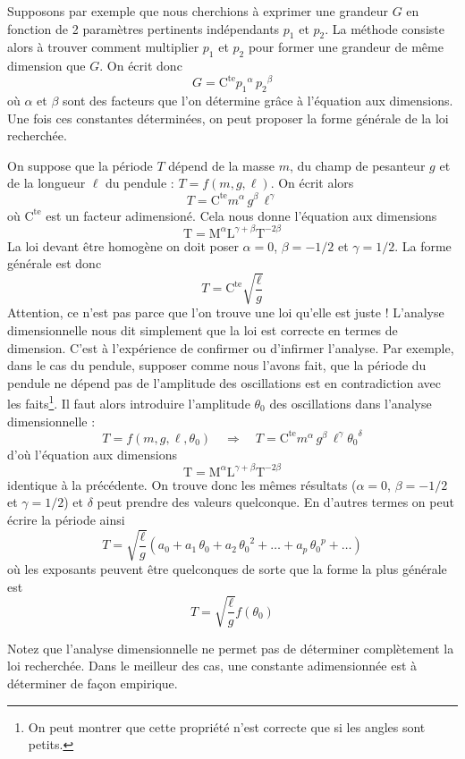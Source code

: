 Supposons par exemple que nous cherchions à exprimer une grandeur $G$ en fonction de 2 paramètres pertinents indépendants $p_{1}$ et $p_{2}$. La méthode consiste alors à trouver comment multiplier $p_1$ et $p_2$ pour former une grandeur de  même dimension que $G$. On écrit donc 
	\[G=\mathrm{C^{te}}{p_1}^\alpha\,{p_2}^\beta\]
où $\alpha$ et $\beta$ sont des facteurs que l'on détermine grâce à l'équation aux dimensions. Une fois ces constantes déterminées, on peut proposer la forme générale de la loi recherchée.

\begin{kaoexample}[frametitle=Exemple : période d'oscillation $T$ d'un pendule simple]
On suppose que la période $T$ dépend de la masse $m$, du champ de pesanteur $g$ et de la longueur $\ell$ du pendule : $T=f(m,g,\ell)$. On écrit alors 
	\[T=\mathrm{C^{te}}m^{\alpha}\,g^{\beta}\,\ell^{\gamma}\]	
où $\mathrm{C^{te}}$ est un facteur adimensioné. Cela nous donne l'équation aux dimensions 
	\[\mathrm{T}=\mathrm{M}^{\alpha}\mathrm{L}^{\gamma+\beta}\mathrm{T}^{-2\beta}\]
La loi devant être homogène on doit poser $\alpha=0$, $\beta=-1/2$ et $\gamma=1/2$. La forme générale est donc 
	\[T=\mathrm{C^{te}}\sqrt{\frac{\ell}{g}}\]
Attention, ce n'est pas parce que l'on trouve une loi qu'elle est juste ! L'analyse dimensionnelle nous dit simplement que la loi est correcte en termes de dimension. C'est à l'expérience de confirmer ou d'infirmer l'analyse. Par exemple, dans le cas du pendule, supposer comme nous l'avons fait, que la période du pendule ne dépend pas de l'amplitude des oscillations est en contradiction avec les faits\footnote{On peut montrer que cette propriété n'est correcte que si les angles sont petits.}. Il faut alors introduire l'amplitude $\theta_0$ des oscillations dans l'analyse dimensionnelle : 
	\[T=f(m,g,\ell,\theta_0)
	\quad\Longrightarrow\quad
	T=\mathrm{C^{te}}m^{\alpha}\,g^{\beta}\,\ell^{\gamma}{\theta_0}^\delta\]	
d'où l'équation aux dimensions 
	\[\mathrm{T}=\mathrm{M}^{\alpha}\mathrm{L}^{\gamma+\beta}\mathrm{T}^{-2\beta}\]
identique à la précédente. On trouve donc les mêmes résultats ($\alpha=0$, $\beta=-1/2$ et $\gamma=1/2$) et $\delta$ peut prendre des valeurs quelconque. En d'autres termes on peut écrire la période ainsi
\[
	T=\sqrt{\frac{\ell}{g}}(a_0+a_1\,\theta_0+a_2\,{\theta_0}^2+\ldots+a_p\,{\theta_0}^p+\ldots)
\]
où les exposants peuvent être quelconques de sorte que la forme la plus générale est 
\[T=\sqrt{\frac{\ell}{g}}f(\theta_0)\]
\end{kaoexample} 
	
Notez que l'analyse dimensionnelle ne permet pas de déterminer complètement la loi recherchée. Dans le meilleur des cas, une constante adimensionnée est à déterminer de façon empirique.



